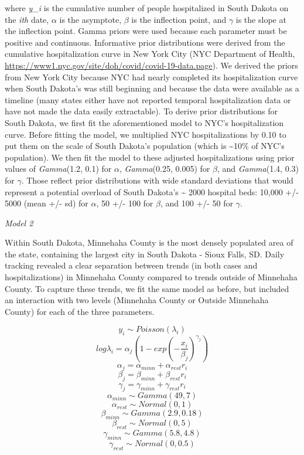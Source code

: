 \documentclass[
]{article}
\begin{document}
where \emph{y\_i} is the cumulative number of people hospitalized in South Dakota on the \emph{ith} date, \(\alpha\) is the asymptote, \(\beta\) is the inflection point, and \(\gamma\) is the slope at the inflection point. Gamma priors were used because each parameter must be positive and continuous.
Informative prior distributions were derived from the cumulative hospitalization curve in New York City (NYC Department of Health, \url{https://www1.nyc.gov/site/doh/covid/covid-19-data.page}). We derived the priors from New York City because NYC had nearly completed its hospitalization curve when South Dakota's was still beginning and because the data were available as a timeline (many states either have not reported temporal hospitalization data or have not made the data easily extractable).
To derive prior distributions for South Dakota, we first fit the aforementioned model to NYC's hospitalization curve. Before fitting the model, we multiplied NYC hospitalizations by 0.10 to put them on the scale of South Dakota's population (which is \textasciitilde10\% of NYC's population). We then fit the model to these adjusted hospitalizations using prior values of \emph{Gamma}(1.2, 0.1) for \(\alpha\), \emph{Gamma}(0.25, 0.005) for \(\beta\), and \emph{Gamma}(1.4, 0.3) for \(\gamma\). Those reflect prior distributions with wide standard deviations that would represent a potential overload of South Dakota's \textasciitilde{} 2000 hospital beds: 10,000 +/- 5000 (mean +/- sd) for \(\alpha\), 50 +/- 100 for \(\beta\), and 100 +/- 50 for \(\gamma\).

\emph{Model 2}

Within South Dakota, Minnehaha County is the most densely populated area of the state, containing the largest city in South Dakota - Sioux Falls, SD. Daily tracking revealed a clear separation between trends (in both cases and hospitalizations) in Minnehaha County compared to trends outside of Minnehaha County. To capture these trends, we fit the same model as before, but included an interaction with two levels (Minnehaha County or Outside Minnehaha County) for each of the three parameters.

\[y_i \sim Poisson(\lambda_i)\]
\[log\lambda_i = \alpha_j(1 - exp(-\frac{x_i}{\beta_j})^{\gamma_j})\]
\[\alpha_j = \alpha_{minn} + \alpha_{rest}r_i\]
\[\beta_j = \beta_{minn} + \beta_{rest}r_i\]
\[\gamma_j = \gamma_{minn} + \gamma_{rest}r_i\]
\[\alpha_{minn} \sim Gamma(49,7)\]
\[\alpha_{rest} \sim Normal(0,1)\]
\[\beta_{minn} \sim Gamma(2.9, 0.18)\]
\[\beta_{rest} \sim Normal(0, 5)\]
\[\gamma_{minn} \sim Gamma(5.8, 4.8)\]
\[\gamma_{rest} \sim Normal(0,0.5)\]
\end{document}
